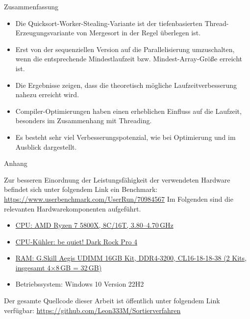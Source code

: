 \documentclass[10pt, ngerman]{beamer}
\begin{document}
\begin{frame}{Zusammenfassung}
    \begin{itemize}
        \item Die Quicksort-Worker-Stealing-Variante ist der tiefenbasierten Thread-Erzeugungsvariante von Mergesort in der Regel überlegen ist.
        \item Erst von der sequenziellen Version auf die Parallelisierung umzuschalten,
              wenn die entsprechende Mindestlaufzeit bzw. Mindest-Array-Größe erreicht ist.
        \item Die Ergebnisse zeigen, dass die theoretisch mögliche Laufzeitverbesserung nahezu erreicht wird.
        \item Compiler-Optimierungen haben einen erheblichen Einfluss auf die Laufzeit, besonders im Zusammenhang mit Threading.
        \item Es besteht sehr viel Verbesserungspotenzial, wie bei Optimierung und im Ausblick dargestellt.
    \end{itemize}
\end{frame}

\begin{frame}{Anhang}

    Zur besseren Einordnung der Leistungsfähigkeit der verwendeten Hardware befindet sich unter folgendem Link ein Benchmark:
    \newline
    \href{https://www.userbenchmark.com/UserRun/70984567}{https://www.userbenchmark.com/UserRun/70984567}
    \vspace{0.5cm}
    \newline
    Im Folgenden sind die relevanten Hardwarekomponenten aufgeführt.
    \begin{itemize}
        \item \href{https://geizhals.de/amd-ryzen-7-5800x-100-100000063wof-a2392525.html?t=alle&plz=&va=b&vl=de&hloc=de&v=e&togglecountry=set}
              {CPU: AMD Ryzen 7 5800X, 8C/16T, 3.80--4.70\,GHz}
              \newline
        \item \href{https://geizhals.de/be-quiet-dark-rock-pro-4-bk022-a1794846.html?hloc=de}
              {CPU-Kühler: be quiet! Dark Rock Pro 4}
              \newline
        \item \href{https://geizhals.de/g-skill-aegis-dimm-kit-16gb-f4-3200c16d-16gis-a2151626.html?hloc=de}
              {RAM: G.Skill Aegis UDIMM 16GB Kit, DDR4-3200, CL16-18-18-38 (2 Kits, insgesamt 4×8\,GB = 32\,GB)}
              \newline
        \item Betriebssystem: Windows 10 Version 22H2
    \end{itemize}
    \vspace{0.5cm}
    Der gesamte Quellcode dieser Arbeit ist öffentlich unter folgendem Link verfügbar:
    \newline
    \href{https://github.com/Leon333M/Sortierverfahren}{https://github.com/Leon333M/Sortierverfahren}

\end{frame}
\end{document}
